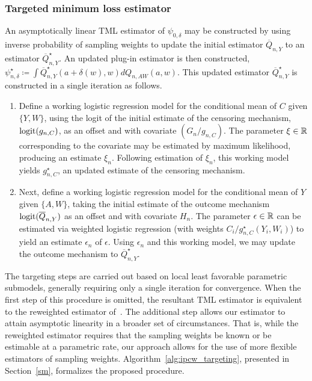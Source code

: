 \subsubsection{Targeted minimum loss estimator}\label{tmle}

An asymptotically linear TML estimator of $\psi_{0,\delta}$ may be constructed
by using inverse probability of sampling weights to update the initial estimator
$\overline{Q}_{n,Y}$ to an estimator $\overline{Q}_{n,Y}^{\star}$. An updated
plug-in estimator is then constructed, $\psi_{n,\delta}^{\star} \coloneqq \int
\overline{Q}_{n,Y}^{\star}(a + \delta(w), w) dQ_{n,AW}(a,w)$. This updated
estimator $\overline{Q}_{n,Y}^{\star}$ is constructed in a single iteration as
follows.
\begin{enumerate}[leftmargin=1cm]
 \item Define a working logistic regression model for the conditional mean
     of $C$ given $\{Y, W\}$, using the logit of the initial estimate of the
     censoring mechanism, $\operatorname{logit}(g_{n,C})$, as an offset and with covariate
     $(G_n / g_{n,C})$. The parameter $\xi \in \mathbb{R}$ corresponding to the
     covariate may be estimated by maximum likelihood, producing an estimate
     $\xi_n$. Following estimation of $\xi_n$, this working model yields
     $g_{n,C}^{\star}$, an updated estimate of the censoring mechanism.
 \item Next, define a working logistic regression model for the conditional mean
     of $Y$ given $\{A,W\}$, taking the initial estimate of the outcome mechanism
     $\operatorname{logit}(\overline{Q}_{n,Y})$ as an offset and with covariate $H_n$. The
     parameter $\epsilon \in \mathbb{R}$ can be estimated via weighted logistic regression
     (with weights $C_i / g^{\star}_{n,C}(Y_i,W_i)$) to yield an estimate
     $\epsilon_n$ of $\epsilon$. Using $\epsilon_n$ and this working model, we may
     update the outcome mechanism to $\overline{Q}_{n,Y}^{\star}$.
\end{enumerate}

The targeting steps are carried out based on local least favorable parametric
submodels, generally requiring only a single iteration for convergence. When the
first step of this procedure is omitted, the resultant TML estimator is
equivalent to the reweighted estimator of~\citet{rose2011targeted2sd}. The
additional step allows our estimator to attain asymptotic linearity in a broader
set of circumstances. That is, while the reweighted estimator requires that the
sampling weights be known or be estimable at a parametric rate, our approach
allows for the use of more flexible estimators of sampling weights.
Algorithm~\ref{alg:ipcw_targeting}, presented in
Section~\ref{sm}, formalizes the proposed procedure.

